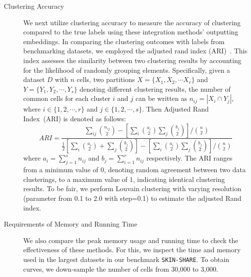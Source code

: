\begin{description}
	\item[Clustering Accuracy] We next utilize clustering accuracy to measure the accuracy of clustering compared to the true labels using these integration methods' outputting embeddings. In comparing the clustering outcomes with labels from benchmarking datasets, we employed the adjusted rand index (ARI)~\citep{hubert1985ARI}. This index assesses the similarity between two clustering results by accounting for the likelihood of randomly grouping elements. Specifically, given a dataset $D$ with $n$ cells, two partitions $ X = \{ X_{1}, X_{2}, \cdots X_{r} \} $ and $ Y = \{ Y_{1}, Y_{2}, \cdots, Y_{s} \} $ denoting different clustering results, the number of common cells for each cluster $i$ and $j$ can be written as $n_{ij} = | X_{i} \cap Y_{j} |$, where $ i \in \{1, 2, \cdots, r \} $ and $ j \in \{1, 2, \cdots, s \} $. Then Adjusted Rand Index~(ARI) is denoted as follows:
	\begin{equation}
		ARI = \frac{\sum_{ij} {n_{ij} \choose 2} - [ \sum_{i} {a_{i} \choose 2} \sum_{j} {b_{j} \choose 2 } ] / {n \choose 2}}{\frac{1}{2} [\sum_{i} {a_{i} \choose 2 } + \sum_{j} {b_{j} \choose 2}] - [\sum_{i} {a_{i} \choose 2} \sum_{j} {b_{j} \choose 2 } ] / {n \choose 2} }
	\end{equation}
	where $ a_{i} = \sum_{j=1}^{s} n_{ij} $ and $ b_{j} = \sum_{i=1}^{r} n_{ij} $ respectively. The ARI ranges from a minimum value of 0, denoting random agreement between two data clusterings, to a maximum value of 1, indicating identical clustering results.  To be fair, we perform Louvain clustering with varying resolution (parameter from 0.1 to 2.0 with step=0.1) to estimate the adjusted Rand index. 

	\item[Requirements of Memory and Running Time] We also compare the peak memory usage and running time to check the effectiveness of these methods. For this, we inspect the time and memory used in the largest datasets in our benchmark \texttt{SKIN-SHARE}. To obtain curves, we down-sample the number of cells from 30,000 to 3,000.
\end{description}




